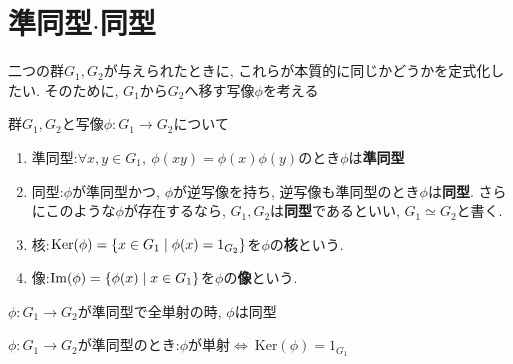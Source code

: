 \section{準同型$\cdot$同型}

二つの群$G_1, G_2$が与えられたときに, これらが本質的に同じかどうかを定式化したい. 
そのために, $G_1$から$G_2$へ移す写像$\phi$を考える

\begin{deftcolorbox}[title=準同型$\cdot$同型]
    群$G_1, G_2$と写像$\phi:G_1 \rightarrow G_2$について

    \begin{enumerate}
        \item 準同型:$\forall x,y\in G_1,\ \phi(xy)=\phi(x)\phi(y)$のとき$\phi$は\textbf{準同型}
        \item 同型:$\phi$が準同型かつ, $\phi$が逆写像を持ち, 逆写像も準同型のとき$\phi$は\textbf{同型}.
        さらにこのような$\phi$が存在するなら, $G_1, G_2$は\textbf{同型}であるといい, $G_1 \simeq G_2$と書く.
        \item 核:$\mathrm{Ker} (\phi) = \qty{x \in G_1 \mid \phi(x) = 1_{G_2}}$を$\phi$の\textbf{核}という.
        \item 像:$\mathrm{Im} (\phi) = \qty{ \phi(x) \mid x \in G_1}$を$\phi$の\textbf{像}という.
    \end{enumerate}
\end{deftcolorbox}

\begin{theotcolorbox}
    $\phi:G_1 \rightarrow G_2$が準同型で全単射の時, $\phi$は同型
\end{theotcolorbox}

\begin{theotcolorbox}
    $\phi:G_1 \rightarrow G_2$が準同型のとき:$\phi$が単射$\Leftrightarrow\ \mathrm{Ker}(\phi)={1_{G_1}}$
\end{theotcolorbox}

